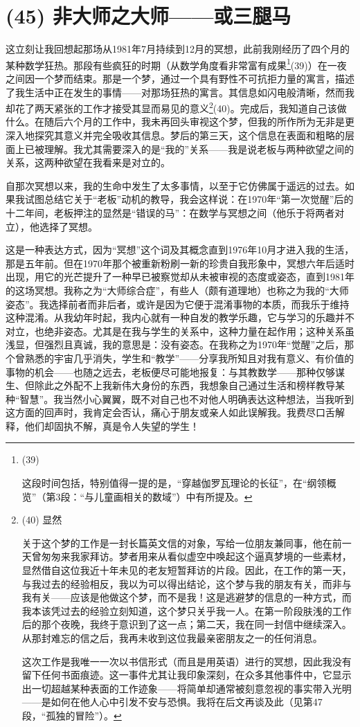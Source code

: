 \section{(45) 非大师之大师——或三腿马}

这立刻让我回想起那场从1981年7月持续到12月的冥想，此前我刚经历了四个月的某种数学狂热。那段有些疯狂的时期（从数学角度看非常富有成果\footnote{(39) \par 这段时间包括，特别值得一提的是，``穿越伽罗瓦理论的长征''，在``纲领概览''（第3段：“与儿童画相关的数域”）中有所提及。}(39)）在一夜之间因一个梦而结束。那是一个梦，通过一个具有野性不可抗拒力量的寓言，描述了我生活中正在发生的事情——对那场狂热的寓言。其信息如闪电般清晰，然而我却花了两天紧张的工作才接受其显而易见的意义\footnote{(40) 显然

关于这个梦的工作是一封长篇英文信的对象，写给一位朋友兼同事，他在前一天曾匆匆来我家拜访。梦者用来从看似虚空中唤起这个逼真梦境的一些素材，显然借自这位我近十年未见的老友短暂拜访的片段。因此，在工作的第一天，与我过去的经验相反，我以为可以得出结论，这个梦与我的朋友有关，而非与我有关——应该是他做这个梦，而不是我！这是逃避梦的信息的一种方式，而我本该凭过去的经验立刻知道，这个梦只关乎我一人。在第一阶段肤浅的工作后的那个夜晚，我终于意识到了这一点；第二天，我在同一封信中继续深入。从那封难忘的信之后，我再未收到这位我最亲密朋友之一的任何消息。

这次工作是我唯一一次以书信形式（而且是用英语）进行的冥想，因此我没有留下任何书面痕迹。这一事件尤其让我印象深刻，在众多其他事件中，它显示出一切超越某种表面的工作迹象——将简单却通常被刻意忽视的事实带入光明——是如何在他人心中引发不安与恐惧。我将在后文再谈及此（见第47段，“孤独的冒险”）。}(40)。完成后，我知道自己该做什么。在随后六个月的工作中，我未再回头审视这个梦，但我的所作所为无非是更深入地探究其意义并完全吸收其信息。梦后的第三天，这个信息在表面和粗略的层面上已被理解。我尤其需要深入的是“我的”关系——我是说老板与两种欲望之间的关系，这两种欲望在我看来是对立的。

自那次冥想以来，我的生命中发生了太多事情，以至于它仿佛属于遥远的过去。如果我试图总结它关于“老板”动机的教导，我会这样说：在1970年“第一次觉醒”后的十二年间，老板押注的显然是“错误的马”：在数学与冥想之间（他乐于将两者对立），他选择了冥想。

这是一种表达方式，因为“冥想”这个词及其概念直到1976年10月才进入我的生活，那是五年前。但在1970年那个被重新粉刷一新的珍贵自我形象中，冥想六年后适时出现，用它的光芒提升了一种早已被察觉却从未被审视的态度或姿态，直到1981年的这场冥想。我称之为“大师综合症”，有些人（颇有道理地）也称之为我的“大师姿态”。我选择前者而非后者，或许是因为它便于混淆事物的本质，而我乐于维持这种混淆。从我幼年时起，我内心就有一种自发的教学乐趣，它与学习的乐趣并不对立，也绝非姿态。尤其是在我与学生的关系中，这种力量在起作用；这种关系虽浅显，但强烈且真诚，我的意思是：没有姿态。在我称之为1970年“觉醒”之后，那个曾熟悉的宇宙几乎消失，学生和“教学”——分享我所知且对我有意义、有价值的事物的机会——也随之远去，老板便尽可能地报复：与其教数学——那种仅够谋生、但除此之外配不上我新伟大身份的东西，我想象自己通过生活和榜样教导某种“智慧”。我当然小心翼翼，既不对自己也不对他人明确表达这种想法，当我听到这方面的回声时，我肯定会否认，痛心于朋友或亲人如此误解我。我费尽口舌解释，他们却固执不解，真是令人失望的学生！

